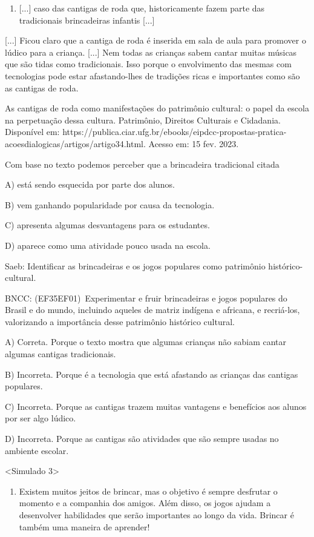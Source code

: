 \begin{enumerate}
\def\labelenumi{\arabic{enumi}.}
\item
  {[}...{]} caso das cantigas de roda que, historicamente fazem parte
  das tradicionais brincadeiras infantis {[}...{]}
\end{enumerate}

{[}...{]} Ficou claro que a cantiga de roda é inserida em sala de aula
para promover o lúdico para a criança. {[}...{]} Nem todas as crianças
sabem cantar muitas músicas que são tidas como tradicionais. Isso porque
o envolvimento das mesmas com tecnologias pode estar afastando-lhes de
tradições ricas e importantes como são as cantigas de roda.

As cantigas de roda como manifestações do patrimônio cultural: o papel
da escola na perpetuação dessa cultura. Patrimônio, Direitos Culturais e
Cidadania. Disponível em:
https://publica.ciar.ufg.br/ebooks/eipdcc-propostas-pratica-acoesdialogicas/artigos/artigo34.html.
Acesso em: 15 fev. 2023.

Com base no texto podemos perceber que a brincadeira tradicional citada

A) está sendo esquecida por parte dos alunos.

B) vem ganhando popularidade por causa da tecnologia.

C) apresenta algumas desvantagens para os estudantes.

D) aparece como uma atividade pouco usada na escola.

Saeb: Identificar as brincadeiras e os jogos populares como patrimônio
histórico-cultural.

BNCC: (EF35EF01)~Experimentar e fruir brincadeiras e jogos populares do
Brasil e do mundo, incluindo aqueles de matriz indígena e africana, e
recriá-los, valorizando a importância desse patrimônio histórico
cultural.

A) Correta. Porque o texto mostra que algumas crianças não sabiam cantar
algumas cantigas tradicionais.

B) Incorreta. Porque é a tecnologia que está afastando as crianças das
cantigas populares.

C) Incorreta. Porque as cantigas trazem muitas vantagens e benefícios
aos alunos por ser algo lúdico.

D) Incorreta. Porque as cantigas são atividades que são sempre usadas no
ambiente escolar.

\textless{}Simulado 3\textgreater{}

\begin{enumerate}
\def\labelenumi{\arabic{enumi}.}
\item
  Existem muitos jeitos de brincar, mas o objetivo é sempre desfrutar o
  momento e a companhia dos amigos. Além disso, os jogos ajudam a
  desenvolver habilidades que serão importantes ao longo da vida.
  Brincar é também uma maneira de aprender!
\end{enumerate}

